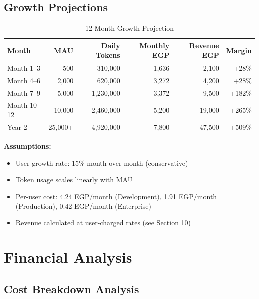 \documentclass[11pt,a4paper]{article}
\begin{document}
\subsection{Growth Projections}

\begin{table}[H]
\centering
\begin{tabular}{|l|r|r|r|r|r|}
\hline
\textbf{Month} & \textbf{MAU} & \textbf{Daily Tokens} & \textbf{Monthly EGP} & \textbf{Revenue EGP} & \textbf{Margin} \\
\hline
Month 1--3 & 500 & 310,000 & 1,636 & 2,100 & +28\% \\
\hline
Month 4--6 & 2,000 & 620,000 & 3,272 & 4,200 & +28\% \\
\hline
Month 7--9 & 5,000 & 1,230,000 & 3,372 & 9,500 & +182\% \\
\hline
Month 10--12 & 10,000 & 2,460,000 & 5,200 & 19,000 & +265\% \\
\hline
Year 2 & 25,000+ & 4,920,000 & 7,800 & 47,500 & +509\% \\
\hline
\end{tabular}
\caption{12-Month Growth Projection}
\end{table}

\noindent\textbf{Assumptions:}
\begin{itemize}[leftmargin=2em]
    \item User growth rate: 15\% month-over-month (conservative)
    \item Token usage scales linearly with MAU
    \item Per-user cost: 4.24 EGP/month (Development), 1.91 EGP/month (Production), 0.42 EGP/month (Enterprise)
    \item Revenue calculated at user-charged rates (see Section 10)
\end{itemize}

\newpage

\section{Financial Analysis}

\subsection{Cost Breakdown Analysis}
\end{document}
